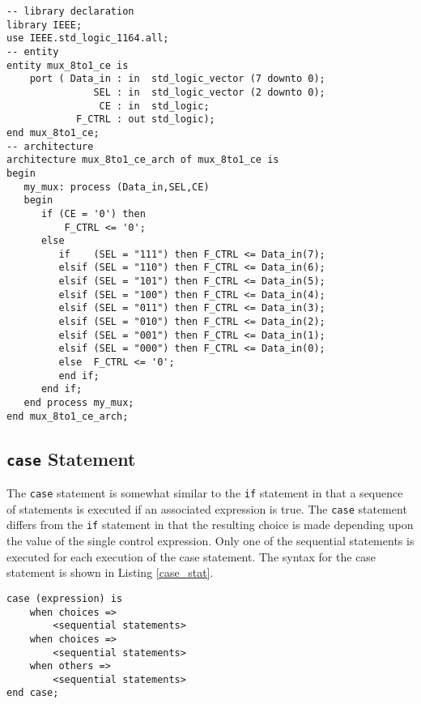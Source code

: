 \noindent
\begin{minipage}{0.99\linewidth}
\begin{lstlisting}[label=exe_11, caption=Solution to Example 11.]
-- library declaration
library IEEE;
use IEEE.std_logic_1164.all;
-- entity
entity mux_8to1_ce is
    port ( Data_in : in  std_logic_vector (7 downto 0);
               SEL : in  std_logic_vector (2 downto 0);
                CE : in  std_logic;
            F_CTRL : out std_logic);  
end mux_8to1_ce;
-- architecture
architecture mux_8to1_ce_arch of mux_8to1_ce is 
begin
   my_mux: process (Data_in,SEL,CE)
   begin
      if (CE = '0') then 
          F_CTRL <= '0'; 
      else 
         if    (SEL = "111") then F_CTRL <= Data_in(7); 
         elsif (SEL = "110") then F_CTRL <= Data_in(6); 
         elsif (SEL = "101") then F_CTRL <= Data_in(5); 
         elsif (SEL = "100") then F_CTRL <= Data_in(4); 
         elsif (SEL = "011") then F_CTRL <= Data_in(3); 
         elsif (SEL = "010") then F_CTRL <= Data_in(2); 
         elsif (SEL = "001") then F_CTRL <= Data_in(1); 
         elsif (SEL = "000") then F_CTRL <= Data_in(0); 
         else  F_CTRL <= '0'; 
         end if; 
      end if; 
   end process my_mux; 
end mux_8to1_ce_arch; 
\end{lstlisting}
\end{minipage}

\subsection{\texttt{case} Statement}
The \texttt{case} statement is somewhat similar to the \texttt{if} statement in that a sequence of statements is executed if an associated expression is true. The \texttt{case} statement differs from the \texttt{if} statement in that the resulting choice is made depending upon the value of the single control expression. Only one of the sequential statements is executed for each execution of the case statement. The syntax for the case statement is shown in Listing \ref{case_stat}.

\noindent
\begin{minipage}{0.99\linewidth}
\begin{lstlisting}[label=case_stat, caption=Syntax for the \textit{case} statement.]
case (expression) is
	when choices =>
		<sequential statements>
	when choices =>
		<sequential statements>
	when others =>
		<sequential statements>
end case;
\end{lstlisting}
\end{minipage}

